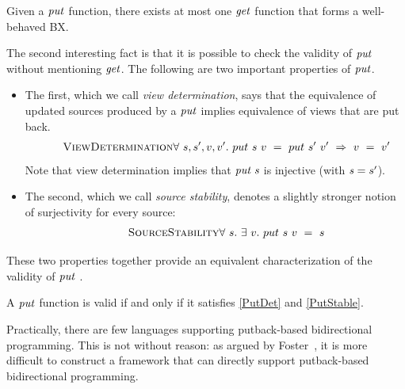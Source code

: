 \begin{lemma}
\label{lemma:injective}
Given a \ensuremath{\Varid{put}} function, there exists at most 
one \ensuremath{\Varid{get}} function that forms a well-behaved BX.
\end{lemma}


The second interesting fact is that it is possible to
check the validity of \ensuremath{\Varid{put}} without mentioning \ensuremath{\Varid{get}}.
The following are two important properties of \ensuremath{\Varid{put}}.
\begin{itemize}
\item 
 The first, which we call \emph{view determination}, says that the equivalence 
of updated sources produced by a \ensuremath{\Varid{put}} implies equivalence of views that are put back.
\begin{align*}
	\label{PutDet}
	\tag*{\textsc{ViewDetermination}}
	\forall~s,s',v,v'.~put~s~v~=~put~s'~v'~\Rightarrow~v~=~v'
\end{align*}
Note that view determination implies that \ensuremath{\Varid{put}\;\Varid{s}} is injective (with \ensuremath{\Varid{s}\mathrel{=}s^\prime}).

\item The second, which we call \emph{source stability}, denotes a slightly stronger notion of surjectivity for every source:
\begin{align*}
	\label{PutStable}
	\tag*{\textsc{SourceStability}}
	\forall~s.~\exists~v.~put~s~v~=~s
\end{align*}
\end{itemize}
These two properties together provide an equivalent characterization of 
the validity of \ensuremath{\Varid{put}} \cite{FiHP15b}. 
\begin{theorem}
\label{th:put2}
A \ensuremath{\Varid{put}} function is valid if and only if it satisfies \ref{PutDet} and \ref{PutStable}. 
\end{theorem}


Practically, there are few languages supporting putback-based
bidirectional programming. This is not without reason: as argued by Foster~\cite{Foster:09},
it is more difficult to construct a
framework that can directly support putback-based bidirectional
programming.

